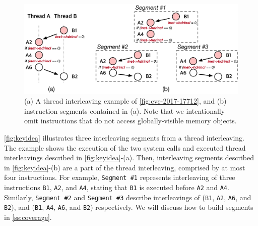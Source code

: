 %
\begin{figure}[t]
  \centering
  \includegraphics[width=0.99\linewidth]{fig/intuition.pdf}
  \caption{(a) A thread interleaving example of
    \autoref{fig:cve-2017-17712}, and (b) instruction segments
    contained in (a).  Note that we intentionally omit instructions
    that do not access globally-visible memory objects.}
  \label{fig:keyidea}
\end{figure}
%
\autoref{fig:keyidea} illustrates three interleaving segments 
from a thread interleaving.%
%
The example shows the execution of the two system calls 
and executed thread interleavings described in
\autoref{fig:keyidea}-(a).
%
Then, interleaving segments described in \autoref{fig:keyidea}-(b) are
a part of the thread interleaving, comprised by at most four instructions.
%
For example, \texttt{Segment \#1} represents interleaving of three
instructions \texttt{B1}, \texttt{A2}, and \texttt{A4}, stating that
\texttt{B1} is executed before \texttt{A2} and \texttt{A4}.
%
Similarly, \texttt{Segment \#2} and \texttt{Segment \#3} describe
interleavings of (\texttt{B1}, \texttt{A2}, \texttt{A6}, and
\texttt{B2}), and (\texttt{B1}, \texttt{A4}, \texttt{A6}, and
\texttt{B2}) respectively.
We will discuss how to build segments in \autoref{ss:coverage}.

%
%
%


